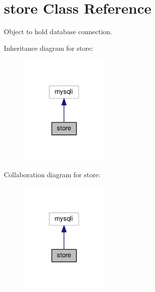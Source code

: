 \hypertarget{classstore}{}\section{store Class Reference}
\label{classstore}


Object to hold database connection.  




Inheritance diagram for store\+:\nopagebreak
\begin{figure}[H]
\begin{center}
\leavevmode
\includegraphics[width=125pt]{classstore__inherit__graph}
\end{center}
\end{figure}


Collaboration diagram for store\+:\nopagebreak
\begin{figure}[H]
\begin{center}
\leavevmode
\includegraphics[width=125pt]{classstore__coll__graph}
\end{center}
\end{figure}

